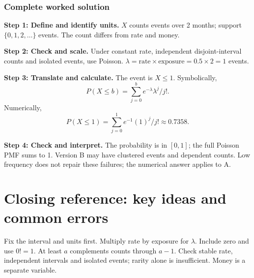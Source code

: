 \subsubsection*{Complete worked solution}
\par\noindent\begin{minipage}{\linewidth}
\textbf{Step 1: Define and identify units.} $X$ counts events over 2 months; support $\{0,1,2,\ldots\}$ events. The count differs from rate and money.
\end{minipage}\par\medskip
\par\noindent\begin{minipage}{\linewidth}
\textbf{Step 2: Check and scale.} Under constant rate, independent disjoint-interval counts and isolated events, use Poisson. $\lambda=\text{rate}\times\text{exposure}=0.5\times2=1$ events.
\end{minipage}\par\medskip
\par\noindent\begin{minipage}{\linewidth}
\textbf{Step 3: Translate and calculate.} The event is $ X\leq1$. Symbolically,
\[P(X\leq b)=\sum_{j=0}^{b}e^{-\lambda}\lambda^j/j!.\]
Numerically,
\[P(X\leq1)=\sum_{j=0}^{1} e^{-1}(1)^j/j!\approx 0.7358.\]
\end{minipage}\par\medskip
\par\noindent\begin{minipage}{\linewidth}
\textbf{Step 4: Check and interpret.} The probability is in $[0,1]$; the full Poisson PMF sums to 1. Version B may have clustered events and dependent counts. Low frequency does not repair these failures; the numerical answer applies to A.
\end{minipage}\par\medskip
{}
\section{Closing reference: key ideas and common errors}
Fix the interval and units first. Multiply rate by exposure for $\lambda$. Include zero and use $0!=1$. At least $a$ complements counts through $a-1$. Check stable rate, independent intervals and isolated events; rarity alone is insufficient. Money is a separate variable.
\secInicio

